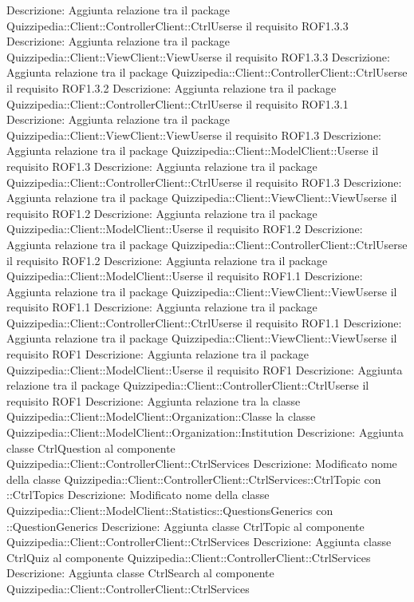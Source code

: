 Descrizione: Aggiunta relazione tra il package Quizzipedia::Client::ControllerClient::CtrlUserse il requisito ROF1.3.3 
Descrizione: Aggiunta relazione tra il package Quizzipedia::Client::ViewClient::ViewUserse il requisito ROF1.3.3 
Descrizione: Aggiunta relazione tra il package Quizzipedia::Client::ControllerClient::CtrlUserse il requisito ROF1.3.2 
Descrizione: Aggiunta relazione tra il package Quizzipedia::Client::ControllerClient::CtrlUserse il requisito ROF1.3.1 
Descrizione: Aggiunta relazione tra il package Quizzipedia::Client::ViewClient::ViewUserse il requisito ROF1.3 
Descrizione: Aggiunta relazione tra il package Quizzipedia::Client::ModelClient::Userse il requisito ROF1.3 
Descrizione: Aggiunta relazione tra il package Quizzipedia::Client::ControllerClient::CtrlUserse il requisito ROF1.3 
Descrizione: Aggiunta relazione tra il package Quizzipedia::Client::ViewClient::ViewUserse il requisito ROF1.2 
Descrizione: Aggiunta relazione tra il package Quizzipedia::Client::ModelClient::Userse il requisito ROF1.2 
Descrizione: Aggiunta relazione tra il package Quizzipedia::Client::ControllerClient::CtrlUserse il requisito ROF1.2 
Descrizione: Aggiunta relazione tra il package Quizzipedia::Client::ModelClient::Userse il requisito ROF1.1 
Descrizione: Aggiunta relazione tra il package Quizzipedia::Client::ViewClient::ViewUserse il requisito ROF1.1 
Descrizione: Aggiunta relazione tra il package Quizzipedia::Client::ControllerClient::CtrlUserse il requisito ROF1.1 
Descrizione: Aggiunta relazione tra il package Quizzipedia::Client::ViewClient::ViewUserse il requisito ROF1 
Descrizione: Aggiunta relazione tra il package Quizzipedia::Client::ModelClient::Userse il requisito ROF1 
Descrizione: Aggiunta relazione tra il package Quizzipedia::Client::ControllerClient::CtrlUserse il requisito ROF1 
Descrizione: Aggiunta relazione tra la classe Quizzipedia::Client::ModelClient::Organization::Classe la classe Quizzipedia::Client::ModelClient::Organization::Institution 
Descrizione: Aggiunta classe CtrlQuestion al componente Quizzipedia::Client::ControllerClient::CtrlServices 
Descrizione: Modificato nome della classe Quizzipedia::Client::ControllerClient::CtrlServices::CtrlTopic con ::CtrlTopics 
Descrizione: Modificato nome della classe Quizzipedia::Client::ModelClient::Statistics::QuestionsGenerics con ::QuestionGenerics 
Descrizione: Aggiunta classe CtrlTopic al componente Quizzipedia::Client::ControllerClient::CtrlServices 
Descrizione: Aggiunta classe CtrlQuiz al componente Quizzipedia::Client::ControllerClient::CtrlServices 
Descrizione: Aggiunta classe CtrlSearch al componente Quizzipedia::Client::ControllerClient::CtrlServices 
